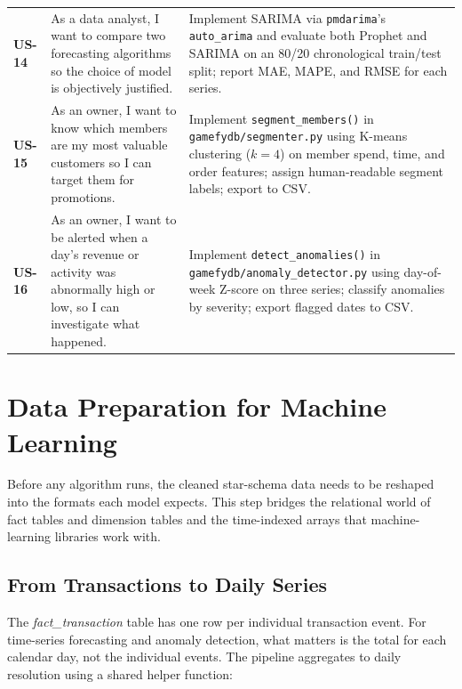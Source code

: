 \begin{longtable}{>{\bfseries}p{1.3cm} p{4.0cm} p{7.2cm}}
  US-14 & As a data analyst, I want to compare two forecasting algorithms so
          the choice of model is objectively justified.
        & Implement SARIMA via \texttt{pmdarima}'s \texttt{auto\_arima} and evaluate
          both Prophet and SARIMA on an 80/20 chronological train/test split;
          report MAE, MAPE, and RMSE for each series. \\[4pt]

  US-15 & As an owner, I want to know which members are my most valuable customers
          so I can target them for promotions.
        & Implement \texttt{segment\_members()} in \texttt{gamefydb/segmenter.py}
          using K-means clustering ($k=4$) on member spend, time, and order features;
          assign human-readable segment labels; export to CSV. \\[4pt]

  US-16 & As an owner, I want to be alerted when a day's revenue or activity was
          abnormally high or low, so I can investigate what happened.
        & Implement \texttt{detect\_anomalies()} in \texttt{gamefydb/anomaly\_detector.py}
          using day-of-week Z-score on three series; classify anomalies by severity;
          export flagged dates to CSV. \\
\end{longtable}

\section{Data Preparation for Machine Learning}

Before any algorithm runs, the cleaned star-schema data needs to be reshaped into
the formats each model expects. This step bridges the relational world of fact tables
and dimension tables and the time-indexed arrays that machine-learning libraries work
with.

\subsection{From Transactions to Daily Series}

The \textit{fact\_transaction} table has one row per individual transaction event.
For time-series forecasting and anomaly detection, what matters is the total for each
calendar day, not the individual events. The pipeline aggregates to daily resolution
using a shared helper function:


